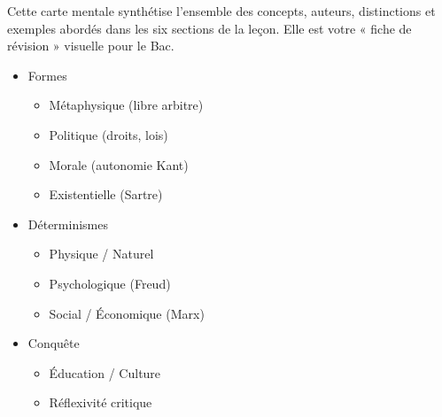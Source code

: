 \documentclass[11pt]{article}
\begin{document}
Cette carte mentale synthétise l'ensemble des concepts, auteurs, distinctions et exemples abordés dans les six sections de la leçon. Elle est votre « fiche de révision » visuelle pour le Bac.

\begin{popfigure}
\begin{center}\end{center}
\vspace{-2pt}
\begin{tcbraster}[raster columns=2,raster equal height=rows,raster column skip=6pt,raster row skip=6pt,enhanced,blankest]
\begin{tcolorbox}[enhanced,colback=white,colframe=popgreen!70!black,boxrule=0.9pt,arc=3pt,title={Liberté},fonttitle=\bfseries\scriptsize,coltitle=white,colbacktitle=popgreen!70!black,left=4pt,right=4pt,top=2pt,bottom=2pt,boxsep=1pt,toptitle=1.5pt,bottomtitle=1.5pt,halign=left]
\begin{itemize}[nosep,leftmargin=*,itemsep=1pt,font=\scriptsize]
\item Formes
\begin{itemize}[nosep,leftmargin=1.1em,itemsep=0pt]
\item Métaphysique (libre arbitre)
\item Politique (droits, lois)
\item Morale (autonomie Kant)
\item Existentielle (Sartre)
\end{itemize}
\item Déterminismes
\begin{itemize}[nosep,leftmargin=1.1em,itemsep=0pt]
\item Physique / Naturel
\item Psychologique (Freud)
\item Social / Économique (Marx)
\end{itemize}
\item Conquête
\begin{itemize}[nosep,leftmargin=1.1em,itemsep=0pt]
\item Éducation / Culture
\item Réflexivité critique
\end{itemize}
\end{itemize}
\end{tcolorbox}
\begin{tcolorbox}[enhanced,colback=white,colframe=poporange!80!black,boxrule=0.9pt,arc=3pt,title={Responsabilité},fonttitle=\bfseries\scriptsize,coltitle=white,colbacktitle=poporange!80!black,left=4pt,right=4pt,top=2pt,bottom=2pt,boxsep=1pt,toptitle=1.5pt,bottomtitle=1.5pt,halign=left]

\end{tcolorbox}
\end{tcbraster}
\end{popfigure}
\end{document}
